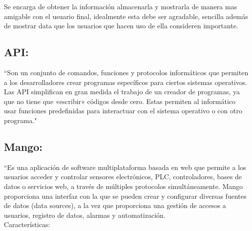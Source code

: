     Se encarga de obtener la información almacenarla y mostrarla de manera mas amigable con el usuario final, idealmente 
    esta debe ser agradable, sencilla además de mostrar data que los usuarios que hacen uso de ella consideren importante.
\subsection{API:} ``Son un conjunto de comandos, funciones y protocolos informáticos que permiten a los desarrolladores crear programas específicos para ciertos sistemas operativos. Las API simplifican en gran medida el trabajo de un creador de programas, ya que no tiene que «escribir» códigos desde cero. Estas permiten al informático usar funciones predefinidas para interactuar con el sistema operativo o con otro programa."\textcolor{blue}{\cite{API}} 
	
\subsection{Mango:} ``Es una aplicación de software multiplataforma basada en web que permite a los usuarios acceder y controlar sensores electrónicos, PLC, controladores, bases de datos o servicios web, a través de múltiples protocolos simultáneamente. Mango proporciona una interfaz con la que se pueden crear y configurar diversas fuentes de datos (data sources), a la vez que proporciona una gestión de accesos a usuarios, registro de datos, alarmas y automatización.\\
	
	Características:
	
